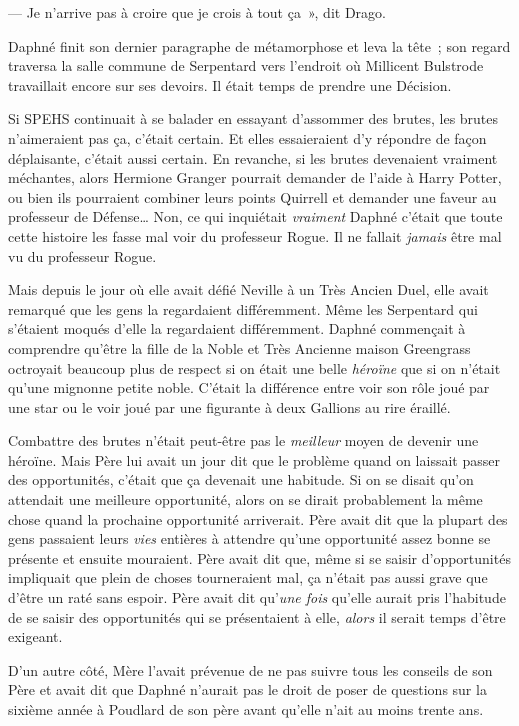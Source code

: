 --- Je n'arrive pas à croire que je crois à tout ça~», dit Drago.

\later

Daphné finit son dernier paragraphe de métamorphose et leva la tête~; son regard traversa la salle commune de Serpentard vers l'endroit où Millicent Bulstrode travaillait encore sur ses devoirs.
Il était temps de prendre une Décision.

Si SPEHS continuait à se balader en essayant d'assommer des brutes, les brutes n'aimeraient pas ça, c'était certain.
Et elles essaieraient d'y répondre de façon déplaisante, c'était aussi certain.
En revanche, si les brutes devenaient vraiment méchantes, alors Hermione Granger pourrait demander de l'aide à Harry Potter, ou bien ils pourraient combiner leurs points Quirrell et demander une faveur au professeur de Défense…
Non, ce qui inquiétait \emph{vraiment} Daphné c'était que toute cette histoire les fasse mal voir du professeur Rogue.
Il ne fallait \emph{jamais} être mal vu du professeur Rogue.

Mais depuis le jour où elle avait défié Neville à un Très Ancien Duel, elle avait remarqué que les gens la regardaient différemment.
Même les Serpentard qui s'étaient moqués d'elle la regardaient différemment.
Daphné commençait à comprendre qu'être la fille de la Noble et Très Ancienne maison Greengrass octroyait beaucoup plus de respect si on était une belle \emph{héroïne} que si on n'était qu'une mignonne petite noble.
C'était la différence entre voir son rôle joué par une star ou le voir joué par une figurante à deux Gallions au rire éraillé.

Combattre des brutes n'était peut-être pas le \emph{meilleur} moyen de devenir une héroïne.
Mais Père lui avait un jour dit que le problème quand on laissait passer des opportunités, c'était que ça devenait une habitude.
Si on se disait qu'on attendait une meilleure opportunité, alors on se dirait probablement la même chose quand la prochaine opportunité arriverait.
Père avait dit que la plupart des gens passaient leurs \emph{vies} entières à attendre qu'une opportunité assez bonne se présente et ensuite mouraient.
Père avait dit que, même si se saisir d'opportunités impliquait que plein de choses tourneraient mal, ça n'était pas aussi grave que d'être un raté sans espoir.
Père avait dit qu'\emph{une fois} qu'elle aurait pris l'habitude de se saisir des opportunités qui se présentaient à elle, \emph{alors} il serait temps d'être exigeant.

D'un autre côté, Mère l'avait prévenue de ne pas suivre tous les conseils de son Père et avait dit que Daphné n'aurait pas le droit de poser de questions sur la sixième année à Poudlard de son père avant qu'elle n'ait au moins trente ans.

